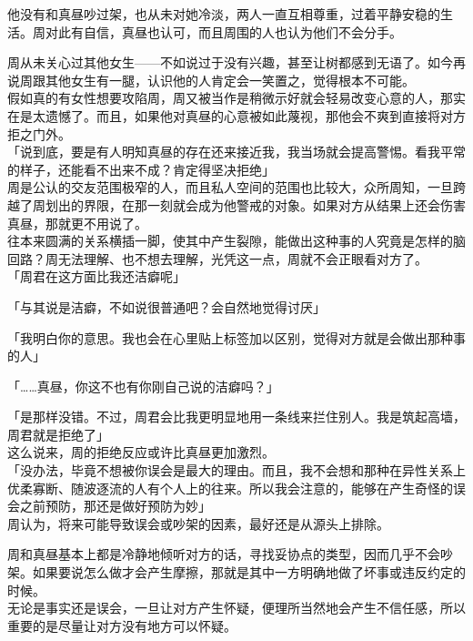 他没有和真昼吵过架，也从未对她冷淡，两人一直互相尊重，过着平静安稳的生活。周对此有自信，真昼也认可，而且周围的人也认为他们不会分手。

周从未关心过其他女生——不如说过于没有兴趣，甚至让树都感到无语了。如今再说周跟其他女生有一腿，认识他的人肯定会一笑置之，觉得根本不可能。\\

假如真的有女性想要攻陷周，周又被当作是稍微示好就会轻易改变心意的人，那实在是太遗憾了。而且，如果他对真昼的心意被如此蔑视，那他会不爽到直接将对方拒之门外。\\

「说到底，要是有人明知真昼的存在还来接近我，我当场就会提高警惕。看我平常的样子，还能看不出来不成？肯定得坚决拒绝」\\

周是公认的交友范围极窄的人，而且私人空间的范围也比较大，众所周知，一旦跨越了周划出的界限，在那一刻就会成为他警戒的对象。如果对方从结果上还会伤害真昼，那就更不用说了。\\

往本来圆满的关系横插一脚，使其中产生裂隙，能做出这种事的人究竟是怎样的脑回路？周无法理解、也不想去理解，光凭这一点，周就不会正眼看对方了。\\

「周君在这方面比我还洁癖呢」

「与其说是洁癖，不如说很普通吧？会自然地觉得讨厌」

「我明白你的意思。我也会在心里贴上标签加以区别，觉得对方就是会做出那种事的人」

「……真昼，你这不也有你刚自己说的洁癖吗？」

「是那样没错。不过，周君会比我更明显地用一条线来拦住别人。我是筑起高墙，周君就是拒绝了」\\

这么说来，周的拒绝反应或许比真昼更加激烈。\\

「没办法，毕竟不想被你误会是最大的理由。而且，我不会想和那种在异性关系上优柔寡断、随波逐流的人有个人上的往来。所以我会注意的，能够在产生奇怪的误会之前预防，那还是做好预防为妙」\\

周认为，将来可能导致误会或吵架的因素，最好还是从源头上排除。

周和真昼基本上都是冷静地倾听对方的话，寻找妥协点的类型，因而几乎不会吵架。如果要说怎么做才会产生摩擦，那就是其中一方明确地做了坏事或违反约定的时候。\\

无论是事实还是误会，一旦让对方产生怀疑，便理所当然地会产生不信任感，所以重要的是尽量让对方没有地方可以怀疑。\\

